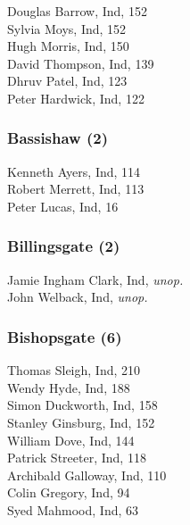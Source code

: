 \documentclass[a4paper,openany,10pt]{book}
\begin{document}


Douglas Barrow, Ind, 152\\
Sylvia Moys, Ind, 152\\
Hugh Morris, Ind, 150\\
David Thompson, Ind, 139\\
Dhruv Patel, Ind, 123\\
Peter Hardwick, Ind, 122\\


\subsubsection*{Bassishaw (2)}



Kenneth Ayers, Ind, 114\\
Robert Merrett, Ind, 113\\
Peter Lucas, Ind, 16\\


\subsubsection*{Billingsgate (2)}



Jamie Ingham Clark, Ind, \emph{unop.}\\
John Welback, Ind, \emph{unop.}\\


\subsubsection*{Bishopsgate (6)}



Thomas Sleigh, Ind, 210\\
Wendy Hyde, Ind, 188\\
Simon Duckworth, Ind, 158\\
Stanley Ginsburg, Ind, 152\\
William Dove, Ind, 144\\
Patrick Streeter, Ind, 118\\
Archibald Galloway, Ind, 110\\
Colin Gregory, Ind, 94\\
Syed Mahmood, Ind, 63\\
\end{document}
